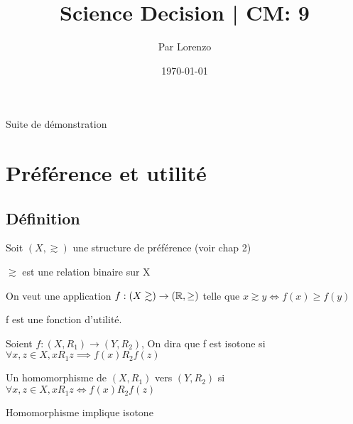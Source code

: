 \documentclass[a4paper, 12pt]{article}
\title{Science Decision | CM: 9}
\author{Par Lorenzo}
\date{\today}
\begin{document}
\maketitle

Suite de démonstration

\begin{demonstration}

\end{demonstration}

\section{Préférence et utilité}

\subsection{Définition}

\begin{definition}
    Soit $(X, \gtrsim)$ une structure de préférence (voir chap 2)

    $\gtrsim$ est une relation binaire sur X
\end{definition}

On veut une application $f: (X \gtrsim) \rightarrow (\mathbb{R}, \geq)$ telle que $x \gtrsim y \iff f(x) \geq f(y)$

f est une fonction d'utilité.

Soient $f: (X, R_1) \rightarrow (Y, R_2)$, On dira que f est isotone si $\forall x, z \in X, xR_1 z \implies f(x)R_2 f(z)$

Un homomorphisme de $(X, R_1)$ vers $(Y, R_2)$ si $\forall x, z \in X, x R_1 z \iff f(x)R_2 f(z)$

\begin{remark}
    Homomorphisme implique isotone
\end{remark}
\end{document}
